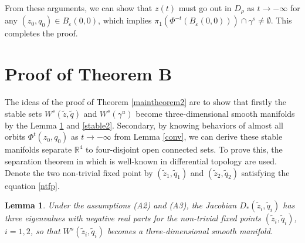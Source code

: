 \documentclass[11pt,reqno]{amsart}
\newtheorem{lemma}[theorem]{Lemma}
\begin{document}
From these arguments, we can show that $z(t)$ must go out in $D_\rho$ as $t\to-\infty$ for any $(z_0,q_0)\in B_\varepsilon(0,0)$, which implies $\pi_1(\Phi^{-t}(B_\varepsilon(0,0)))\cap \gamma^s \neq \emptyset$. This completes the proof.




\section{Proof of Theorem B}
The ideas of the proof of Theorem \ref{maintheorem2} are to show that firstly the stable sets  $W^s(\tilde{z},\tilde{q})$ and $W^s(\gamma^u)$ become three-dimensional smooth manifolds by the Lemma \ref{stable1} and \ref{stable2}. Secondary, by knowing behaviors of almost all orbits $\Phi^t(z_0,q_0)$ as $t\to-\infty$ from Lemma \ref{conv}, we can derive these stable manifolds separate $\mathbb{R}^4$ to four-disjoint open connected sets. To prove this, the separation theorem in \cite{Hirsch} which is well-known in differential topology are used.
Denote the two non-trivial fixed point by $(\tilde{z}_1,\tilde{q}_1)$ and $(\tilde{z}_2,\tilde{q}_2)$ satisfying the equation \eqref{ntfp}.

\begin{lemma}\label{stable1}
Under the assumptions (A2) and (A3), the Jacobian $D_*(\tilde{z}_i,\tilde{q}_i)$  has three eigenvalues with negative real parts for the non-trivial fixed points $(\tilde{z}_i,\tilde{q}_i)$, $i=1,2$, so that $W^s(\tilde{z}_i,\tilde{q}_i)$ becomes a three-dimensional smooth manifold.
\end{lemma}
\end{document}
